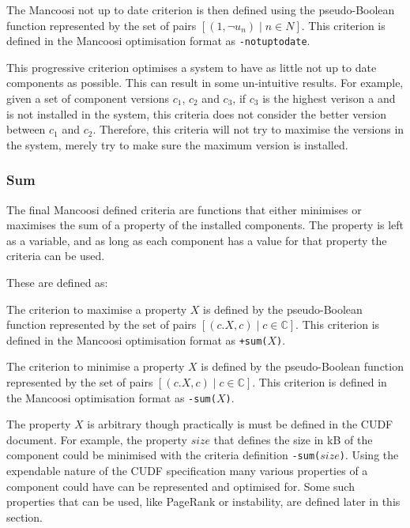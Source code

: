 \begin{defs}
The Mancoosi not up to date criterion is then defined using the pseudo-Boolean function
represented by the set of pairs $[(1,\neg u_n) \mid n \in N]$.
This criterion is defined in the Mancoosi optimisation format as \verb+-notuptodate+.
\end{defs}


This progressive criterion optimises a system to have as little not up to date components as possible.
This can result in some un-intuitive results.
For example, given a set of component versions $c_1$, $c_2$ and $c_3$, if $c_3$ is the highest verison a and is not installed in the system, 
this criteria does not consider the better version between $c_1$ and $c_2$.
Therefore, this criteria will not try to maximise the versions in the system, merely try to make sure the maximum version is installed.

\subsubsection{Sum}
The final Mancoosi defined criteria are functions that either minimises or maximises the sum of a property of the installed components. 
The property is left as a variable, and as long as each component has a value for that property the criteria can be used.

These are defined as:
\begin{defs}
The criterion to maximise a property $X$ is defined by the pseudo-Boolean function 
represented by the set of pairs $[(c.X, c) \mid c \in \mathbb{C}]$.
This criterion is defined in the Mancoosi optimisation format as \verb!+sum(!$X$\verb+)+.
\end{defs}

\begin{defs}
The criterion to minimise a property $X$ is defined by the pseudo-Boolean function 
represented by the set of pairs $[(c.X, c) \mid c \in \mathbb{C}]$.
This criterion is defined in the Mancoosi optimisation format as \verb+-sum(+$X$\verb+)+.
\end{defs}

The property $X$ is arbitrary though practically is must be defined in the CUDF document.
For example, the property $size$ that defines the size in kB of the component could be minimised with the criteria definition \verb+-sum(+$size$\verb+)+.
Using the expendable nature of the CUDF specification many various properties of a component could have can be represented and optimised for.
Some such properties that can be used, like PageRank or instability, are defined later in this section.

